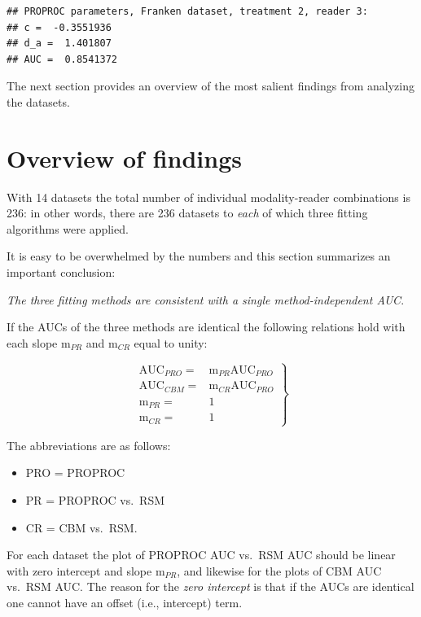 \documentclass[
]{book}
\providecommand{\tightlist}{%
  \setlength{\itemsep}{0pt}\setlength{\parskip}{0pt}}
\begin{document}
\begin{verbatim}
## PROPROC parameters, Franken dataset, treatment 2, reader 3: 
## c =  -0.3551936 
## d_a =  1.401807 
## AUC =  0.8541372
\end{verbatim}

The next section provides an overview of the most salient findings from analyzing the datasets.

\hypertarget{rsm-3-fits-overview}{%
\section{Overview of findings}\label{rsm-3-fits-overview}}

With 14 datasets the total number of individual modality-reader combinations is 236: in other words, there are 236 datasets to \emph{each} of which three fitting algorithms were applied.

It is easy to be overwhelmed by the numbers and this section summarizes an important conclusion:

\emph{The three fitting methods are consistent with a single method-independent AUC}.

If the AUCs of the three methods are identical the following relations hold with each slope \(\text{m}_{PR}\) and \(\text{m}_{CR}\) equal to unity:

\begin{equation}
\left. 
\begin{aligned}
\text{AUC}_{PRO} =& \text{m}_{PR} \text{AUC}_{PRO}  \\
\text{AUC}_{CBM} =& \text{m}_{CR} \text{AUC}_{PRO} \\
\text{m}_{PR}    =& 1 \\
\text{m}_{CR}    =& 1
\end{aligned}
\right \}
\label{eq:rsm-3-fits-slopes-equation1}
\end{equation}

The abbreviations are as follows:

\begin{itemize}
\tightlist
\item
  PRO = PROPROC
\item
  PR = PROPROC vs.~RSM
\item
  CR = CBM vs.~RSM.
\end{itemize}

For each dataset the plot of PROPROC AUC vs.~RSM AUC should be linear with zero intercept and slope \(\text{m}_{PR}\), and likewise for the plots of CBM AUC vs.~RSM AUC. The reason for the \emph{zero intercept} is that if the AUCs are identical one cannot have an offset (i.e., intercept) term.
\end{document}
